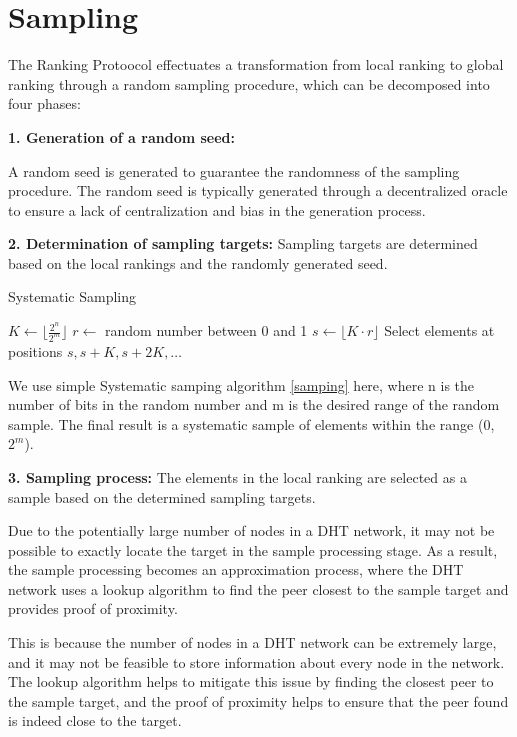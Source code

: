 \documentclass[twocolumn]{article}
\begin{document}
\section{Sampling}

The Ranking Protoocol effectuates a transformation from local ranking to global ranking through a random sampling procedure, which can be decomposed into four phases:

\textbf{1. Generation of a random seed:}

A random seed is generated to guarantee the randomness of the sampling procedure. The random seed is typically generated through a decentralized oracle to ensure a lack of centralization and bias in the generation process.

\textbf{2. Determination of sampling targets:} Sampling targets are determined based on the local rankings and the randomly generated seed.

\begin{algorithm}[htbp]
  \caption{Systematic Sampling}
  \label{samping}
\begin{algorithmic}[1]
\State $K \gets \lfloor \frac{2^n}{2^m} \rfloor$
\State $r \gets$ random number between 0 and 1
\State $s \gets \lfloor K \cdot r \rfloor$
\State Select elements at positions $s, s + K, s + 2K, \dots$
\end{algorithmic}
\end{algorithm}


We use simple Systematic samping algorithm \ref{samping} here, where n is the number of bits in the random number and m is the desired range of the random sample. The final result is a systematic sample of elements within the range (0, $2^m$).

\textbf{3. Sampling process:} The elements in the local ranking are selected as a sample based on the determined sampling targets.

Due to the potentially large number of nodes in a DHT\cite{Chord} network, it may not be possible to exactly locate the target in the sample processing stage. As a result, the sample processing becomes an approximation process, where the DHT network uses a lookup algorithm to find the peer closest to the sample target and provides proof of proximity.

This is because the number of nodes in a DHT network can be extremely large, and it may not be feasible to store information about every node in the network. The lookup algorithm helps to mitigate this issue by finding the closest peer to the sample target, and the proof of proximity helps to ensure that the peer found is indeed close to the target.
\end{document}
